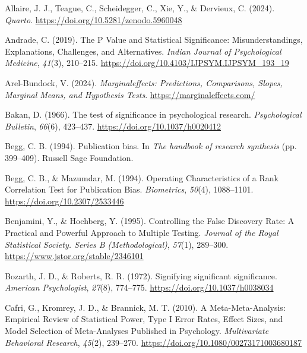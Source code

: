 \documentclass[
  12pt,
]{scrartcl}
\newlength{\cslhangindent}
\newenvironment{CSLReferences}[2] %
 {\begin{list}{}{%
  \setlength{\itemindent}{0pt}
  \setlength{\leftmargin}{0pt}
  \setlength{\parsep}{0pt}
  \ifodd #1
   \setlength{\leftmargin}{\cslhangindent}
   \setlength{\itemindent}{-1\cslhangindent}
  \fi
  \setlength{\itemsep}{#2\baselineskip}}}
 {\end{list}}
\begin{document}
\label{refs}
\begin{CSLReferences}{1}{0}
Allaire, J. J., Teague, C., Scheidegger, C., Xie, Y., \& Dervieux, C.
(2024). \emph{Quarto}. \url{https://doi.org/10.5281/zenodo.5960048}

Andrade, C. (2019). The {P} {Value} and {Statistical} {Significance}:
{Misunderstandings}, {Explanations}, {Challenges}, and {Alternatives}.
\emph{Indian Journal of Psychological Medicine}, \emph{41}(3), 210--215.
\url{https://doi.org/10.4103/IJPSYM.IJPSYM_193_19}

Arel-Bundock, V. (2024). \emph{Marginaleffects: {Predictions},
{Comparisons}, {Slopes}, {Marginal} {Means}, and {Hypothesis} {Tests}}.
\url{https://marginaleffects.com/}

Bakan, D. (1966). The test of significance in psychological research.
\emph{Psychological Bulletin}, \emph{66}(6), 423--437.
\url{https://doi.org/10.1037/h0020412}

Begg, C. B. (1994). Publication bias. In \emph{The handbook of research
synthesis} (pp. 399--409). Russell Sage Foundation.

Begg, C. B., \& Mazumdar, M. (1994). Operating {Characteristics} of a
{Rank} {Correlation} {Test} for {Publication} {Bias}. \emph{Biometrics},
\emph{50}(4), 1088--1101. \url{https://doi.org/10.2307/2533446}

Benjamini, Y., \& Hochberg, Y. (1995). Controlling the {False}
{Discovery} {Rate}: {A} {Practical} and {Powerful} {Approach} to
{Multiple} {Testing}. \emph{Journal of the Royal Statistical Society.
Series B (Methodological)}, \emph{57}(1), 289--300.
\url{https://www.jstor.org/stable/2346101}

Bozarth, J. D., \& Roberts, R. R. (1972). Signifying significant
significance. \emph{American Psychologist}, \emph{27}(8), 774--775.
\url{https://doi.org/10.1037/h0038034}

Cafri, G., Kromrey, J. D., \& Brannick, M. T. (2010). A
{Meta}-{Meta}-{Analysis}: {Empirical} {Review} of {Statistical} {Power},
{Type} {I} {Error} {Rates}, {Effect} {Sizes}, and {Model} {Selection} of
{Meta}-{Analyses} {Published} in {Psychology}. \emph{Multivariate
Behavioral Research}, \emph{45}(2), 239--270.
\url{https://doi.org/10.1080/00273171003680187}


\end{CSLReferences}
\end{document}
